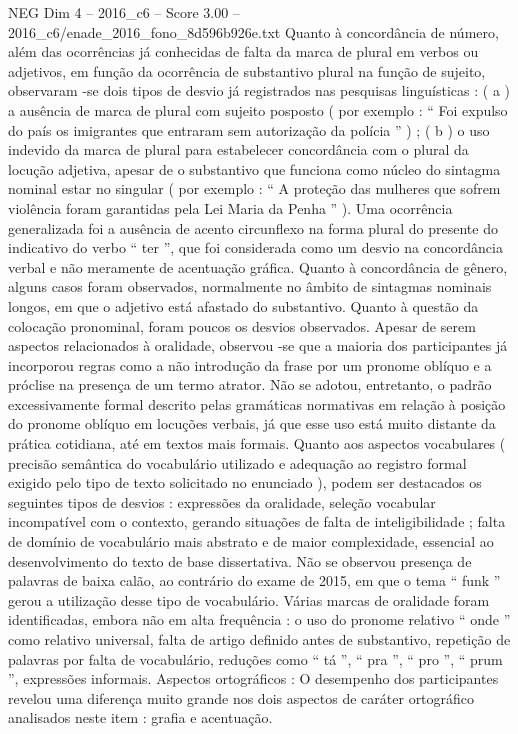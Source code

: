 \begin{textsample}{NEG Dim 4 – 2016\_c6 – Score 3.00 – 2016\_c6/enade\_2016\_fono\_8d596b926e.txt}
Quanto à concordância de número, além das ocorrências já conhecidas de falta da marca de plural em verbos ou adjetivos, em função da ocorrência de substantivo plural na função de sujeito, observaram -se dois tipos de desvio já registrados nas pesquisas linguísticas : ( a ) a ausência de marca de plural com sujeito posposto ( por exemplo : “ Foi expulso do país os imigrantes que entraram sem autorização da polícia ” ) ; ( b ) o uso indevido da marca de plural para estabelecer concordância com o plural da locução adjetiva, apesar de o substantivo que funciona como núcleo do sintagma nominal estar no singular ( por exemplo : “ A proteção das mulheres que sofrem violência foram garantidas pela Lei Maria da Penha ” ).
Uma ocorrência generalizada foi a ausência de acento circunflexo na forma plural do presente do indicativo do verbo “ ter ”, que foi considerada como um desvio na concordância verbal e não meramente de acentuação gráfica.
Quanto à concordância de gênero, alguns casos foram observados, normalmente no âmbito de sintagmas nominais longos, em que o adjetivo está afastado do substantivo.
Quanto à questão da colocação pronominal, foram poucos os desvios observados.
Apesar de serem aspectos relacionados à oralidade, observou -se que a maioria dos participantes já incorporou regras como a não introdução da frase por um pronome oblíquo e a próclise na presença de um termo atrator.
Não se adotou, entretanto, o padrão excessivamente formal descrito pelas gramáticas normativas em relação à posição do pronome oblíquo em locuções verbais, já que esse uso está muito distante da prática cotidiana, até em textos mais formais.
Quanto aos aspectos vocabulares ( precisão semântica do vocabulário utilizado e adequação ao registro formal exigido pelo tipo de texto solicitado no enunciado ), podem ser destacados os seguintes tipos de desvios : expressões da oralidade, seleção vocabular incompatível com o contexto, gerando situações de falta de inteligibilidade ; falta de domínio de vocabulário mais abstrato e de maior complexidade, essencial ao desenvolvimento do texto de base dissertativa.
Não se observou presença de palavras de baixa calão, ao contrário do exame de 2015, em que o tema “ funk ” gerou a utilização desse tipo de vocabulário.
Várias marcas de oralidade foram identificadas, embora não em alta frequência : o uso do pronome relativo “ onde ” como relativo universal, falta de artigo definido antes de substantivo, repetição de palavras por falta de vocabulário, reduções como “ tá ”, “ pra ”, “ pro ”, “ prum ”, expressões informais.
Aspectos ortográficos : O desempenho dos participantes revelou uma diferença muito grande nos dois aspectos de caráter ortográfico analisados neste item : grafia e acentuação.

\end{textsample}
